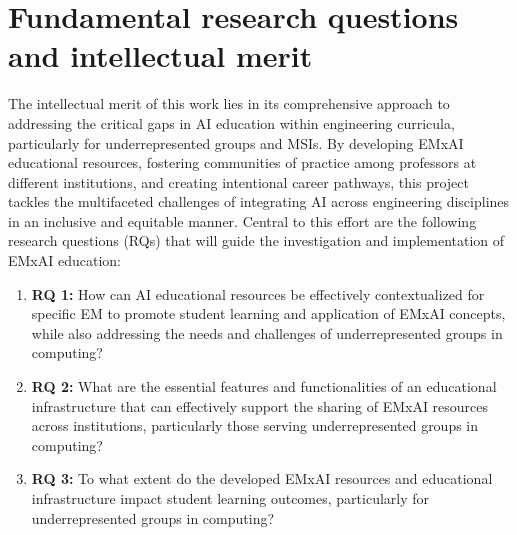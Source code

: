 \documentclass[11pt]{article}
\begin{document}
\section{Fundamental research questions and intellectual merit} 
The intellectual merit of this work lies in its comprehensive approach to addressing the critical gaps in AI education within engineering curricula, particularly for underrepresented groups and MSIs.  
By developing EMxAI educational resources, fostering communities of practice among professors at different institutions, and creating intentional career pathways, this project tackles the multifaceted challenges of integrating AI across engineering disciplines in an inclusive and equitable manner.
Central to this effort are the following research questions (RQs) that will guide the investigation and implementation of EMxAI education:
\begin{tcolorbox}[colback=mycmykcolor, colframe=black, boxrule=1pt, coltext=black]
\begin{enumerate}
    \item[] \textbf{RQ 1:} How can AI educational resources be effectively contextualized for specific EM to promote student learning and application of EMxAI concepts, while also addressing the needs and challenges of underrepresented groups in computing? 
    
    \item[] \textbf{RQ 2:}  What are the essential features and functionalities of an educational infrastructure that can effectively support the sharing of EMxAI resources across institutions, particularly those serving underrepresented groups in computing? 

    \item[] \textbf{RQ 3:}  To what extent do the developed EMxAI resources and educational infrastructure impact student learning outcomes, particularly for underrepresented groups in computing? 
    
\end{enumerate}
\end{tcolorbox}
\end{document}
